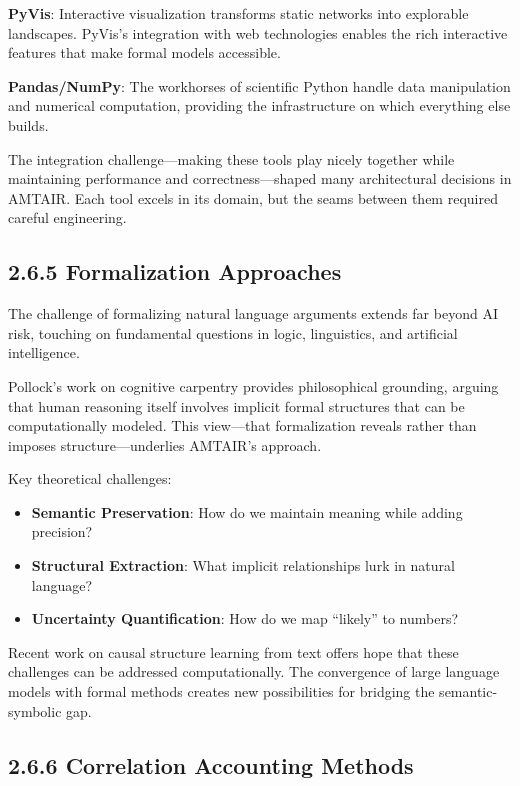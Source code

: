 \documentclass[
  11pt,
  letterpaper,
  openany]{book}
\providecommand{\tightlist}{%
  \setlength{\itemsep}{0pt}\setlength{\parskip}{0pt}}
\begin{document}
\textbf{PyVis}: Interactive visualization transforms static networks
into explorable landscapes. PyVis's integration with web technologies
enables the rich interactive features that make formal models
accessible.

\textbf{Pandas/NumPy}: The workhorses of scientific Python handle data
manipulation and numerical computation, providing the infrastructure on
which everything else builds.

The integration challenge---making these tools play nicely together
while maintaining performance and correctness---shaped many
architectural decisions in AMTAIR. Each tool excels in its domain, but
the seams between them required careful engineering.

\subsection{2.6.5 Formalization Approaches}\label{sec-formalization}

The challenge of formalizing natural language arguments extends far
beyond AI risk, touching on fundamental questions in logic, linguistics,
and artificial intelligence.

Pollock's work on cognitive carpentry \textcite{pollock1995} provides
philosophical grounding, arguing that human reasoning itself involves
implicit formal structures that can be computationally modeled. This
view---that formalization reveals rather than imposes
structure---underlies AMTAIR's approach.

Key theoretical challenges:

\begin{itemize}
\tightlist
\item
  \textbf{Semantic Preservation}: How do we maintain meaning while
  adding precision?
\item
  \textbf{Structural Extraction}: What implicit relationships lurk in
  natural language?
\item
  \textbf{Uncertainty Quantification}: How do we map ``likely'' to
  numbers?
\end{itemize}

Recent work on causal structure learning from text
\textcite{babakov2025} \textcite{ban2023} \textcite{bethard2007} offers
hope that these challenges can be addressed computationally. The
convergence of large language models with formal methods creates new
possibilities for bridging the semantic-symbolic gap.

\subsection{2.6.6 Correlation Accounting
Methods}\label{sec-correlation-methods}
\end{document}
